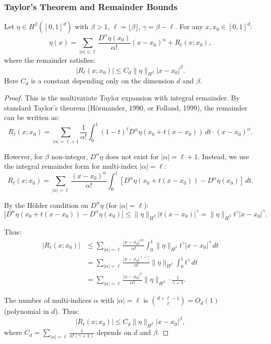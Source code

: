\subsubsection{Taylor's Theorem and Remainder Bounds}

\begin{lemma}
\label{lem:taylor-holder}
Let $\eta \in H^\beta([0,1]^d)$ with $\beta > 1$, $\ell = \lfloor \beta \rfloor$, $\gamma = \beta - \ell$. For any $x, x_0 \in [0,1]^d$:
\[
\eta(x) = \sum_{|\alpha| \le \ell} \frac{D^\alpha \eta(x_0)}{\alpha!} (x - x_0)^\alpha + R_\ell(x; x_0),
\]
where the remainder satisfies:
\[
|R_\ell(x; x_0)| \le C_d \|\eta\|_{H^\beta} |x - x_0|^\beta.
\]
Here $C_d$ is a constant depending only on the dimension $d$ and $\beta$.
\end{lemma}

\begin{proof}
This is the multivariate Taylor expansion with integral remainder. By standard Taylor's theorem (Hörmander, 1990, or Folland, 1999), the remainder can be written as:
\[
R_\ell(x; x_0) = \sum_{|\alpha| = \ell + 1} \frac{1}{\alpha!} \int_0^1 (1-t)^\ell D^\alpha \eta(x_0 + t(x - x_0)) \, dt \cdot (x - x_0)^\alpha.
\]

However, for $\beta$ non-integer, $D^\alpha \eta$ does not exist for $|\alpha| = \ell + 1$. Instead, we use the integral remainder form for multi-index $|\alpha| = \ell$:
\[
R_\ell(x; x_0) = \sum_{|\alpha| = \ell} \frac{(x - x_0)^\alpha}{\alpha!} \int_0^1 [D^\alpha \eta(x_0 + t(x - x_0)) - D^\alpha \eta(x_0)] \, dt.
\]

By the Hölder condition on $D^\alpha \eta$ (for $|\alpha| = \ell$):
\[
|D^\alpha \eta(x_0 + t(x - x_0)) - D^\alpha \eta(x_0)| \le \|\eta\|_{H^\beta} |t(x - x_0)|^\gamma = \|\eta\|_{H^\beta} t^\gamma |x - x_0|^\gamma.
\]

Thus:
\begin{align*}
|R_\ell(x; x_0)|
&\le \sum_{|\alpha| = \ell} \frac{|x - x_0|^{|\alpha|}}{\alpha!} \int_0^1 \|\eta\|_{H^\beta} t^\gamma |x - x_0|^\gamma \, dt \\
&= \sum_{|\alpha| = \ell} \frac{|x - x_0|^{\ell + \gamma}}{\alpha!} \|\eta\|_{H^\beta} \int_0^1 t^\gamma \, dt \\
&= \sum_{|\alpha| = \ell} \frac{|x - x_0|^\beta}{\alpha!} \|\eta\|_{H^\beta} \cdot \frac{1}{\gamma + 1}.
\end{align*}

The number of multi-indices $\alpha$ with $|\alpha| = \ell$ is $\binom{d + \ell - 1}{\ell} = O_d(1)$ (polynomial in $d$). Thus:
\[
|R_\ell(x; x_0)| \le C_d \|\eta\|_{H^\beta} |x - x_0|^\beta,
\]
where $C_d = \sum_{|\alpha|=\ell} \frac{1}{\alpha! (\gamma+1)}$ depends on $d$ and $\beta$.
\end{proof}

